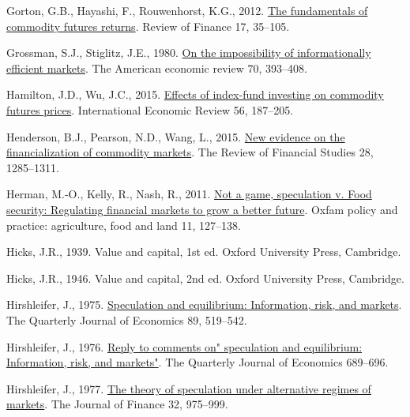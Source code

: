 \documentclass[]{elsarticle} %
\newlength{\cslhangindent}
\newlength{\cslentryspacingunit} %
\newenvironment{CSLReferences}[2] %
 {%
  \setlength{\parindent}{0pt}
  \ifodd #1
  \let\oldpar\par
  \def\par{\hangindent=\cslhangindent\oldpar}
  \fi
  \setlength{\parskip}{#2\cslentryspacingunit}
 }%
 {}
\begin{document}
\begin{CSLReferences}{1}{0}
\leavevmode{}%
Gorton, G.B., Hayashi, F., Rouwenhorst, K.G., 2012. \href{https://doi.org/10.1093/rof/rfs019}{The fundamentals of commodity futures returns}. Review of Finance 17, 35--105.

\leavevmode{}%
Grossman, S.J., Stiglitz, J.E., 1980. \href{https://doi.org/10.7916/d8765r99}{On the impossibility of informationally efficient markets}. The American economic review 70, 393--408.

\leavevmode{}%
Hamilton, J.D., Wu, J.C., 2015. \href{https://doi.org/10.1111/iere.12099}{Effects of index-fund investing on commodity futures prices}. International Economic Review 56, 187--205.

\leavevmode{}%
Henderson, B.J., Pearson, N.D., Wang, L., 2015. \href{https://doi.org/10.1093/rfs/hhu091}{New evidence on the financialization of commodity markets}. The Review of Financial Studies 28, 1285--1311.

\leavevmode{}%
Herman, M.-O., Kelly, R., Nash, R., 2011. \href{https://www.ingentaconnect.com/content/oxpp/oppafl/2011/00000011/00000007/art00005}{Not a game, speculation v. Food security: Regulating financial markets to grow a better future}. Oxfam policy and practice: agriculture, food and land 11, 127--138.

\leavevmode{}%
Hicks, J.R., 1939. Value and capital, 1st ed. Oxford University Press, Cambridge.

\leavevmode{}%
Hicks, J.R., 1946. Value and capital, 2nd ed. Oxford University Press, Cambridge.

\leavevmode{}%
Hirshleifer, J., 1975. \href{https://doi.org/10.2307/1884690}{Speculation and equilibrium: Information, risk, and markets}. The Quarterly Journal of Economics 89, 519--542.

\leavevmode{}%
Hirshleifer, J., 1976. \href{https://doi.org/10.2307/1885330}{Reply to comments on" speculation and equilibrium: Information, risk, and markets"}. The Quarterly Journal of Economics 689--696.

\leavevmode{}%
Hirshleifer, J., 1977. \href{https://doi.org/10.2307/2326507}{The theory of speculation under alternative regimes of markets}. The Journal of Finance 32, 975--999.


\end{CSLReferences}
\end{document}
